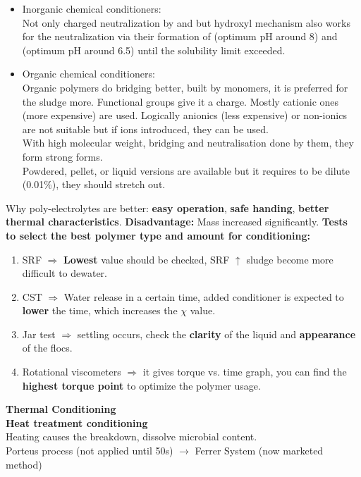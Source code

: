 \documentclass{article}
\numberwithin{equation}{section}
\begin{document}
\begin{itemize}
    \item Inorganic chemical conditioners:\\
    Not only charged neutralization by  and  but hydroxyl mechanism also works for the neutralization via their formation of  (optimum pH around 8) and  (optimum pH around 6.5) until the solubility limit exceeded.
    \item Organic chemical conditioners:\\
    Organic polymers do bridging better, built by monomers, it is preferred for the sludge more. Functional groups give it a charge. Mostly cationic ones (more expensive) are used. Logically anionics (less expensive) or non-ionics are not suitable but if  ions introduced, they can be used.\\
    With high molecular weight, bridging and neutralisation done by them, they form strong forms.\\
    Powdered, pellet, or liquid versions are available but it requires to be dilute (0.01\%), they should stretch out.
\end{itemize}
Why poly-electrolytes are better: \textbf{easy operation}, \textbf{safe handing}, \textbf{better thermal characteristics}.
\textbf{Disadvantage:} Mass increased significantly.
\textbf{Tests to select the best polymer type and amount for conditioning:}
\begin{enumerate}
    \item SRF $\Rightarrow$ \textbf{Lowest} value should be checked, SRF $\uparrow$ sludge become more difficult to dewater.
    \item CST $\Rightarrow$ Water release in a certain time, added conditioner is expected to \textbf{lower} the time, which increases the $\chi$ value.
    \item Jar test $\Rightarrow$ settling occurs, check the \textbf{clarity} of the liquid and \textbf{appearance} of the flocs.
    \item Rotational viscometers $\Rightarrow$ it gives torque vs. time graph, you can find the \textbf{highest torque point} to optimize the polymer usage.
\end{enumerate}
\textbf{Thermal Conditioning}\\
\textbf{Heat treatment conditioning}\\
Heating causes the breakdown, dissolve microbial content.\\
Porteus process (not applied until 50s) $\rightarrow$ Ferrer System (now marketed method)\\
\end{document}
